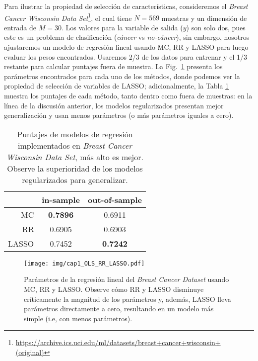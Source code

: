 Para ilustrar la propiedad de selección de características, consideremos el \emph{Breast Cancer Wisconsin Data Set}\footnote{\url{https://archive.ics.uci.edu/ml/datasets/breast+cancer+wisconsin+(original)}}, el cual tiene $N=569$ muestras y un dimensión de entrada de $M=30$. Los valores para la variable de salida ($y$) son solo dos, pues este es un problema de clasificación (\emph{cáncer} vs \emph{no-cáncer}), sin embargo, nosotros ajustaremos un modelo de regresión lineal usando MC, RR y LASSO para luego evaluar los pesos encontrados. Usaremos 2/3 de los datos para entrenar y el 1/3 restante para calcular puntajes fuera de muestra. La Fig.~\ref{fig:MC_RR_LASSO_breastcancer} presenta los parámetros encontrados para cada uno de los métodos, donde podemos ver la propiedad de selección de variables de LASSO; adicionalmente, la Tabla \ref{tab:breastMC_RR_LASSO} muestra los puntajes de cada método, tanto dentro como fuera de muestras: en la línea de la discusión anterior, los modelos regularizados presentan mejor generalización y usan menos parámetros (o más parámetros iguales a cero). 


\begin{table}
\centering
\caption{Puntajes de modelos de regresión implementados en \emph{Breast Cancer Wisconsin Data Set}, más alto es mejor. Observe la superioridad de los modelos regularizados para generalizar.}
	\label{tab:breastMC_RR_LASSO}
	\begin{tabular}{ r|c|c } 
		 & in-sample & out-of-sample \\
		\hline
		MC & \textbf{0.7896} & 0.6911 \\ 
		RR & 0.6905 & 0.6903 \\ 
		LASSO & 0.7452 & \textbf{0.7242}
	\end{tabular}
\end{table}



 



\begin{figure}[H]
	\centering
	\texttt{[image: img/cap1\_OLS\_RR\_LASSO.pdf]}\\
	\caption{Parámetros de la regresión lineal del \emph{Breast Cancer Dataset} usando MC, RR y LASSO. Observe cómo RR y LASSO disminuye críticamente la magnitud de los parámetros y, además, LASSO lleva parámetros directamente a cero, resultando en un modelo más simple (i.e, con menos parámetros).}
	\label{fig:MC_RR_LASSO_breastcancer}  
\end{figure}



